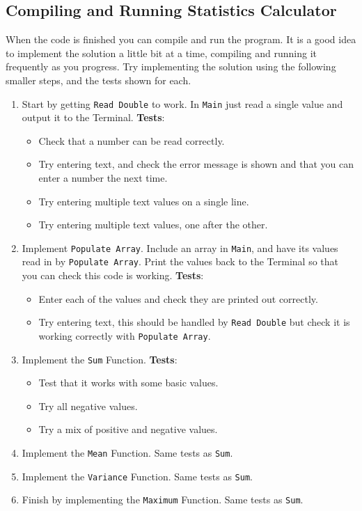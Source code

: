 \clearpage
\subsection{Compiling and Running Statistics Calculator} %
\label{sub:compiling_and_running_statistics_calculator}

When the code is finished you can compile and run the program. It is a good idea to implement the solution a little bit at a time, compiling and running it frequently as you progress. Try implementing the solution using the following smaller steps, and the tests shown for each.

\begin{enumerate}
  \item Start by getting \texttt{Read Double} to work. In \texttt{Main} just read a single value and output it to the Terminal. \textbf{Tests}:
  \begin{itemize}
    \item Check that a number can be read correctly.
    \item Try entering text, and check the error message is shown and that you can enter a number the next time.
    \item Try entering multiple text values on a single line.
    \item Try entering multiple text values, one after the other.
  \end{itemize}
  \item Implement \texttt{Populate Array}. Include an array in \texttt{Main}, and have its values read in by \texttt{Populate Array}. Print the values back to the Terminal so that you can check this code is working. \textbf{Tests}:
  \begin{itemize}
    \item Enter each of the values and check they are printed out correctly.
    \item Try entering text, this should be handled by \texttt{Read Double} but check it is working correctly with \texttt{Populate Array}.
  \end{itemize}
  \item Implement the \texttt{Sum} Function.
  \textbf{Tests}:
  \begin{itemize}
    \item Test that it works with some basic values.
    \item Try all negative values.
    \item Try a mix of positive and negative values.
  \end{itemize}
  \item Implement the \texttt{Mean} Function. Same tests as \texttt{Sum}.
  \item Implement the \texttt{Variance} Function. Same tests as \texttt{Sum}.
  \item Finish by implementing the \texttt{Maximum} Function. Same tests as \texttt{Sum}.
\end{enumerate}

